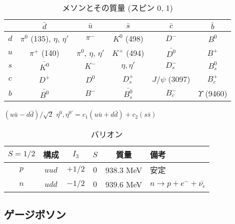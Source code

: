 \documentclass[a4paper,11pt]{jlreq}
\begin{document}
\begin{table}[h]
  \centering
  \begin{tabular}{|c|ccccc|}
    \hline
        & $\bar{d}$                      & $\bar{u}$                & $\bar{s}$     & $\bar{c}$       & $\bar{b}$         \\
    \hline
    $d$ & $\pi^0$ (135), $\eta$, $\eta'$ & $\pi^-$                  & $K^0$ (498)   & $D^-$           & $B^0$             \\
    $u$ & $\pi^+$ (140)                  & $\pi^0$, $\eta$, $\eta'$ & $K^+$ (494)   & $\bar{D^0}$     & $B^+$             \\
    $s$ & $\bar{K^0}$                    & $K^-$                    & $\eta, \eta'$ & $D_s^-$         & $B_s^0$           \\
    $c$ & $D^+$                          & $D^0$                    & $D_s^+$       & $J/\psi$ (3097) & $B_c^+$           \\
    $b$ & $\bar{B^0}$                    & $B^-$                    & $\bar{B_s^0}$ & $B_c^-$         & $\Upsilon$ (9460) \\
    \hline
  \end{tabular}
  \caption{メソンとその質量 (スピン 0, 1)}
  \label{table:meson}
\end{table}

$(u\bar{u} - d\bar{d})/\sqrt{2}$
$\eta^0, \eta^{0'} = c_1(u\bar{u} + d\bar{d}) + c_2(s\bar{s})$

\begin{table}[h]
  \centering
  \begin{tabular}{|c|ccccl|}
    \hline
    $S = 1/2$ & 構成    & $I_3$  & $S$ & 質量               & 備考                            \\
    \hline
    $p$       & $uud$ & $+1/2$ & $0$ & $938.3$ \si{MeV} & 安定                            \\
    $n$       & $udd$ & $-1/2$ & $0$ & $939.6$ \si{MeV} & $n \to p + e^- + \bar{\nu_e}$ \\
    \hline
  \end{tabular}
  \caption{バリオン}
  \label{table:baryon}
\end{table}


\subsection{ゲージボソン}
\end{document}
